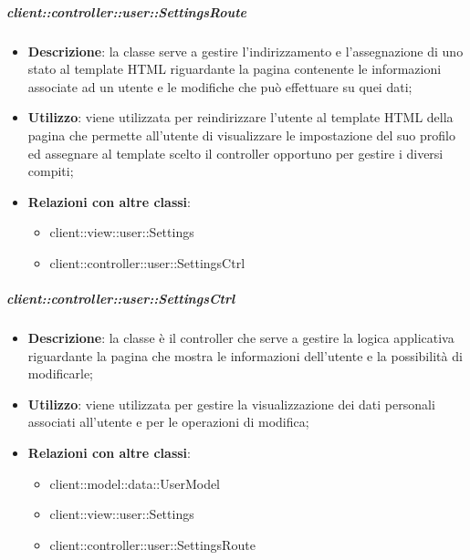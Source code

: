 		\subparagraph{client::controller::user::SettingsRoute} %
		\label{subp:bdsm_app_client_controller_user_settingsroute}
			\begin{itemize}
				\item \textbf{Descrizione}: la classe serve a gestire l'indirizzamento e l'assegnazione di uno stato al template HTML riguardante la pagina contenente le informazioni associate ad un utente e le modifiche che può effettuare su quei dati;
				\item \textbf{Utilizzo}: viene utilizzata per reindirizzare l'utente al template HTML della pagina che permette all'utente di visualizzare le impostazione del suo profilo ed assegnare al template scelto il controller opportuno per gestire i diversi compiti;
				\item \textbf{Relazioni con altre classi}:
					\begin{itemize}
						\item client::view::user::Settings
						\item client::controller::user::SettingsCtrl
					\end{itemize}
			\end{itemize}

		\subparagraph{client::controller::user::SettingsCtrl} %
		\label{subp:client_controller_user_settingsctrl}
			\begin{itemize}
				\item \textbf{Descrizione}: la classe è il controller che serve a gestire la logica applicativa riguardante la pagina che mostra le informazioni dell'utente e la possibilità di modificarle;
				\item \textbf{Utilizzo}: viene utilizzata per gestire la visualizzazione dei dati personali associati all'utente e per le operazioni di modifica;
				\item \textbf{Relazioni con altre classi}:
					\begin{itemize}
						\item client::model::data::UserModel
						\item client::view::user::Settings
						\item client::controller::user::SettingsRoute
					\end{itemize}
			\end{itemize}

